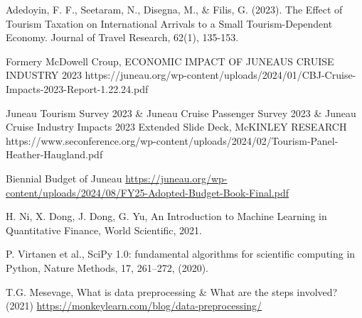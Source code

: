 \documentclass[12pt]{article}  %
\begin{document}

 \clearpage   %
 
 \begin{thebibliography}{99}
    Adedoyin, F. F., Seetaram, N., Disegna, M., \& Filis, G. (2023). The Effect of Tourism Taxation on International Arrivals to a Small Tourism-Dependent Economy. Journal of Travel Research, 62(1), 135-153. 
     
    Formery McDowell Croup, ECONOMIC IMPACT OF JUNEAU\textquotesingle S CRUISE INDUSTRY 2023
    {https://juneau.org/wp-content/uploads/2024/01/CBJ-Cruise-Impacts-2023-Report-1.22.24.pdf}

    Juneau Tourism Survey 2023 \& Juneau Cruise Passenger Survey 2023 \& Juneau Cruise Industry Impacts 2023 Extended Slide Deck, McKINLEY RESEARCH
    {https://www.seconference.org/wp-content/uploads/2024/02/Tourism-Panel-Heather-Haugland.pdf}

    Biennial Budget of Juneau \href{https://juneau.org/wp-content/uploads/2024/08/FY25-Adopted-Budget-Book-Final.pdf}{https://juneau.org/wp-content/uploads/2024/08/FY25-Adopted-Budget-Book-Final.pdf}

   H. Ni, X. Dong, J. Dong, G. Yu, An Introduction to Machine Learning in Quantitative Finance, World Scientific, 2021.
   
   P. Virtanen et al., SciPy 1.0: fundamental algorithms for scientific computing in
   Python, Nature Methods, 17, 261--272, (2020).
   
   T.G. Mesevage, What is data preprocessing \& What are the steps involved? (2021) \href{https://monkeylearn.com/blog/data-preprocessing/}{https://monkeylearn.com/blog/data-preprocessing/}
 \end{thebibliography}
 
 
 
\end{document}
